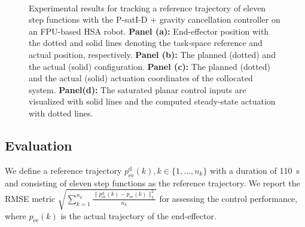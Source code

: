 \begin{figure}[ht]
    \\
    \caption{Experimental results for tracking a reference trajectory of eleven step functions with the P-satI-D + gravity cancellation controller on an FPU-based HSA robot. \textbf{Panel (a):} End-effector position with the dotted and solid lines denoting the task-space reference and actual position, respectively.
    \textbf{Panel (b):} The planned (dotted) and the actual (solid) configuration. 
    \textbf{Panel (c):} The planned (dotted) and the actual (solid) actuation coordinates of the collocated system. 
    \textbf{Panel(d):} The saturated planar control inputs are visualized with solid lines and the computed steady-state actuation with dotted lines.}\label{fig:hsacontrol:experimental_results:configuration_space_regulation:fpu:p_sati_d_plus_gc}
\end{figure}

\subsection{Evaluation}
We define a reference trajectory $p_\mathrm{ee}^\mathrm{d}(k), k \in \{ 1, \dots, n_k \}$ with a duration of \SI{110}{s} and consisting of eleven step functions as the reference trajectory.
We report the \gls{RMSE} metric $\sqrt{\sum_{k=1}^{n_k} \frac{\lVert p_\mathrm{ee}^\mathrm{d}(k) - p_\mathrm{ee}(k) \rVert_2^2}{n_k}}$ for assessing the control performance, where $p_\mathrm{ee}(k)$ is the actual trajectory of the end-effector.\\

